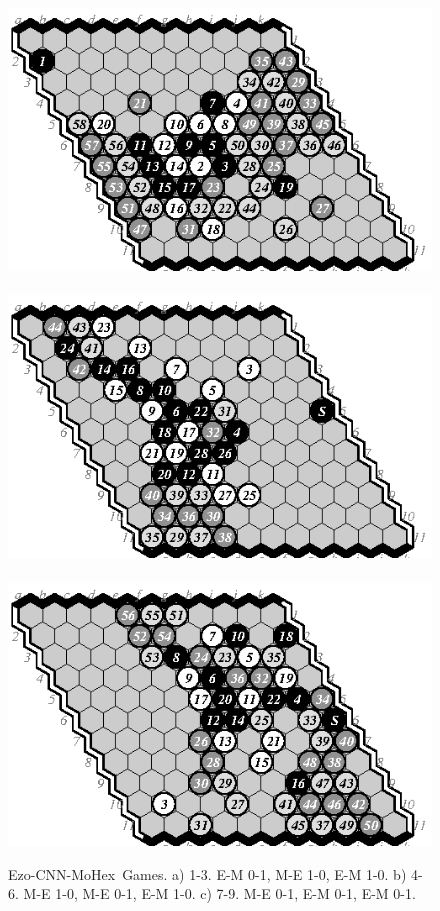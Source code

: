 \documentclass{IOS-Book-Article}
\def\Ec{\mbox{\sc Ezo-CNN}}
\def\Mx{\mbox{\sc MoHex}}
\begin{document}
\begin{figure}
\hspace*{-2cm}\
\includegraphics[scale=1]{pix/11.me7plus.eps}\hspace*{-1.5cm}\
\includegraphics[scale=1]{pix/11.em8plus.eps}\hspace*{-1.5cm}\
\includegraphics[scale=1]{pix/11.em9plus.eps}
\caption{\Ec-\Mx\ Games.
a) 1-3. E-M 0-1, M-E 1-0, E-M 1-0.
b) 4-6. M-E 1-0, M-E 0-1, E-M 1-0.
c) 7-9. M-E 0-1, E-M 0-1, E-M 0-1.}
\label{fig:EM11}
\end{figure}
\end{document}
